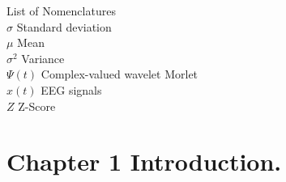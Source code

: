 \documentclass[letterpaper,12pt,openright,oneside]{article}
\begin{document}
\pagebreak

List of Nomenclatures\\

$\sigma$ Standard deviation\\

$\mu$  Mean\\

$\sigma^2$  Variance\\

$\Psi(t)$  Complex-valued wavelet Morlet \\
 
$x(t)$   EEG signals\\

$Z$ Z-Score\\ 
 
 
\pagebreak

\tableofcontents
\listoffigures
\listoftables 

\pagebreak




\section{Chapter 1 Introduction.}



\end{document}

